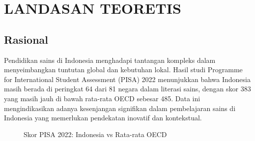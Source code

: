 \documentclass[12pt,a4paper,oneside]{book}
\begin{document}
\cleardoublepage
{\begingroup{}\tableofcontents\endgroup}
\cleardoublepage

\cleardoublepage
{\begingroup{}\listoffigures\endgroup}
\cleardoublepage

\cleardoublepage
{\begingroup{}\listoftables\endgroup}
\cleardoublepage

\fontsize{16pt}{20pt}\selectfont

\chapter{LANDASAN TEORETIS}
\setcounter{figure}{0}

\section{Rasional}

Pendidikan sains di Indonesia menghadapi tantangan kompleks dalam menyeimbangkan tuntutan global dan kebutuhan lokal. Hasil studi Programme for International Student Assessment (PISA) 2022 menunjukkan bahwa Indonesia masih berada di peringkat 64 dari 81 negara dalam literasi sains, dengan skor 383 yang masih jauh di bawah rata-rata OECD sebesar 485. Data ini mengindikasikan adanya kesenjangan signifikan dalam pembelajaran sains di Indonesia yang memerlukan pendekatan inovatif dan kontekstual.

\begin{figure}[H]
\centering
{}
\caption{Skor PISA 2022: Indonesia vs Rata-rata OECD}
\label{fig:pisa_scores}
\end{figure}
\end{document}
